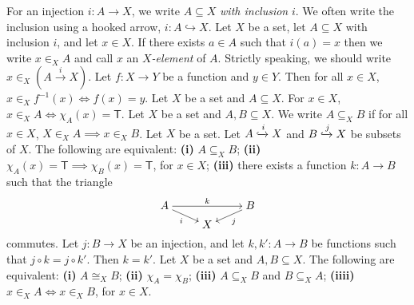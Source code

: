  For an injection $i \colon A \to X$, we write $A \subseteq X$ \textit{with inclusion} $i$. We often write the inclusion using a hooked arrow, $i \colon A \hookrightarrow X$.
 Let $X$ be a set, let $A \subseteq X$ with inclusion $i$, and let $x \in X$. If there exists $a \in A$ such that $i(a) = x$ then we write $x \in_X A$ and call $x$ an \textit{$X$-element} of $A$. Strictly speaking, we should write $x \in_X (A \xrightarrow{i} X)$.
 Let $f \colon X \to Y$ be a function and $y \in Y$. Then for all $x \in X$, $x \in_X f^{-1}(x) \iff f(x) = y$.
 Let $X$ be a set and $A \subseteq X$. For $x \in X$, $x \in_X A \iff \chi_A(x) = \mathsf{T}$.
 Let $X$ be a set and $A, B \subseteq X$. We write $A \subseteq_X B$ if for all $x \in X$, $X \in_X A \implies x \in_X B$.
 Let $X$ be a set. Let $A \xhookrightarrow{i} X$ and $B \xhookrightarrow{j} X$ be subsets of $X$. The following are equivalent: \textbf{(i)} $A \subseteq_X B$; \textbf{(ii)} $\chi_A(x) = \mathsf{T} \implies \chi_B(x) = \mathsf{T}$, for $x \in X$; \textbf{(iii)} there exists a function $k \colon A \to B$ such that the triangle
\[\begin{tikzcd}[cramped,row sep=tiny]
	A && B \\
	& X
	\arrow["k", from=1-1, to=1-3]
	\arrow["i"', from=1-1, to=2-2]
	\arrow["j", from=1-3, to=2-2]
\end{tikzcd}\]
commutes.
 Let $j \colon B \to X$ be an injection, and let $k, k' \colon A \to B$ be functions such that $j \circ k = j \circ k'$. Then $k = k'$.
 Let $X$ be a set and $A, B \subseteq X$. The following are equivalent: \textbf{(i)} $A \cong_X B$; \textbf{(ii)} $\chi_A = \chi_B$; \textbf{(iii)} $A \subseteq_X B$ and $B \subseteq_X A$; \textbf{(iiii)} $x \in_X A \iff x \in_X B$, for $x \in X$.
